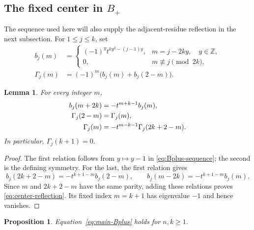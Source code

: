 \documentclass[12pt]{article}
\newtheorem{proposition}[theorem]{Proposition}
\newtheorem{lemma}[theorem]{Lemma}
\numberwithin{equation}{section}
\newcommand{\Z}{\mathbb Z}
\begin{document}
\subsection{The fixed center in \texorpdfstring{$B_+$}{B+}}

The sequence used here will also supply the adjacent-residue reflection
in the next subsection.  For $1\le j\le k$, set
\begin{equation}\label{eq:Bplus-sequence}
\begin{aligned}
 b_j(m)&=
 \begin{cases}
 (-1)^y t^{ky^2-(j-1)y},&m=j-2ky,\quad y\in\Z,\\
 0,&m\not\equiv j\pmod{2k},
 \end{cases}\\
 \Gamma_j(m)&=(-1)^m\bigl(b_j(m)+b_j(2-m)\bigr).
\end{aligned}
\end{equation}

\begin{lemma}\label{lem:center-reflection}
For every integer $m$,
\begin{align}
 b_j(m+2k)&=-t^{m+k-1}b_j(m),\notag\\
 \Gamma_j(2-m)&=\Gamma_j(m),\notag\\
 \Gamma_j(m)&=-t^{m-k-1}\Gamma_j(2k+2-m).
 \label{eq:center-reflection}
\end{align}
In particular, $\Gamma_j(k+1)=0$.
\end{lemma}

\begin{proof}
The first relation follows from $y\mapsto y-1$ in
\eqref{eq:Bplus-sequence}; the second is the defining symmetry.
For the last, the first relation gives
\[
 b_j(2k+2-m)=-t^{k+1-m}b_j(2-m),\qquad
 b_j(m-2k)=-t^{k+1-m}b_j(m).
\]
Since $m$ and $2k+2-m$ have the same parity, adding these relations
proves \eqref{eq:center-reflection}.  Its fixed index $m=k+1$
has eigenvalue $-1$ and hence vanishes.
\end{proof}

\begin{proposition}
Equation~\eqref{eq:main-Bplus} holds for $n,k\ge1$.
\end{proposition}
\end{document}
